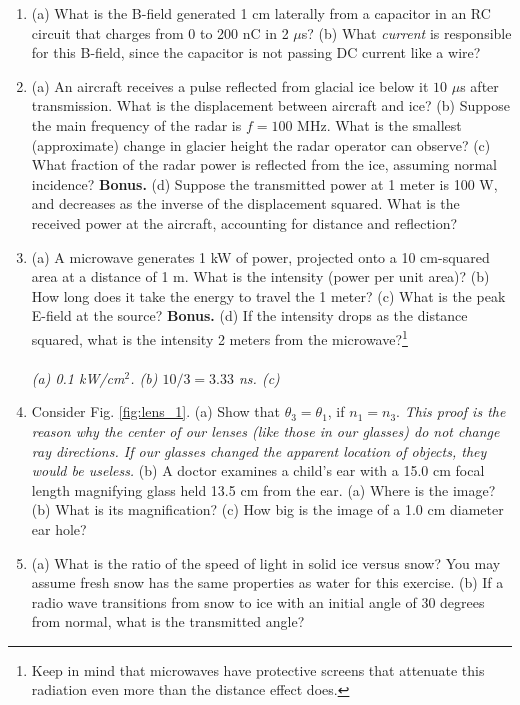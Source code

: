 \documentclass[12pt,twocolumn]{article}
\begin{document}
\noindent
\begin{enumerate}
\item (a) What is the B-field generated 1 cm laterally from a capacitor in an RC circuit that charges from 0 to 200 nC in 2 $\mu$s? (b) What \textit{current} is responsible for this B-field, since the capacitor is not passing DC current like a wire? \\ \vspace{1.5cm}
\item (a) An aircraft receives a pulse reflected from glacial ice below it $10$ $\mu$s after transmission. What is the displacement between aircraft and ice? (b) Suppose the main frequency of the radar is $f = 100$ MHz.  What is the smallest (approximate) change in glacier height the radar operator can observe? (c) What fraction of the radar power is reflected from the ice, assuming normal incidence? \textbf{Bonus.} (d) Suppose the transmitted power at 1 meter is 100 W, and decreases as the inverse of the displacement squared.  What is the received power at the aircraft, accounting for distance and reflection? \\ \vspace{4cm}
\item (a) A microwave generates 1 kW of power, projected onto a 10 cm-squared area at a distance of 1 m.  What is the intensity (power per unit area)? (b) How long does it take the energy to travel the 1 meter? (c) What is the peak E-field at the source?  \textbf{Bonus.} (d) If the intensity drops as the distance squared, what is the intensity 2 meters from the microwave?\footnote{Keep in mind that microwaves have protective screens that attenuate this radiation even more than the distance effect does.} \\ \\
\textit{(a) 0.1 kW/cm$^2$. (b) $10/3 = 3.33$ ns. (c) }
\item Consider Fig. \ref{fig:lens_1}.  (a) Show that $\theta_3 = \theta_1$, if $n_1 = n_3$.  \textit{This proof is the reason why the center of our lenses (like those in our glasses) do not change ray directions.  If our glasses changed the apparent location of objects, they would be useless.} (b) A doctor examines a child's ear with a 15.0 cm focal length magnifying glass held 13.5 cm from the ear. (a) Where is the image? (b) What is its magnification? (c) How big is the image of a 1.0 cm diameter ear hole? \\ \vspace{3cm}
\item (a) What is the ratio of the speed of light in solid ice versus snow?  You may assume fresh snow has the same properties as water for this exercise. (b) If a radio wave transitions from snow to ice with an initial angle of 30 degrees from normal, what is the transmitted angle? \\ \vspace{4cm}

\end{enumerate}
\end{document}
